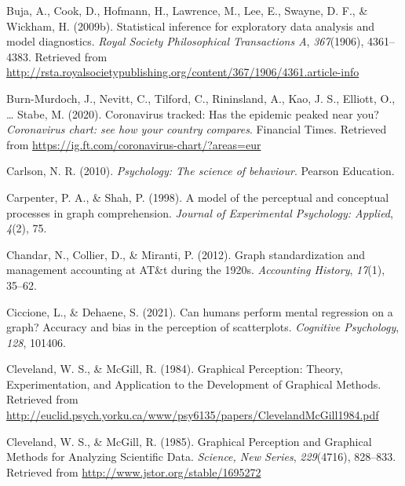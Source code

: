 \documentclass[print]{nuthesis}
\newlength{\cslhangindent}
\newenvironment{CSLReferences}[2]%
{\setlength{\parindent}{0pt}%
\everypar{\setlength{\hangindent}{\cslhangindent}}\ignorespaces}%
{\par}
\begin{document}
\begin{CSLReferences}{1}{0}
\leavevmode{}%
Buja, A., Cook, D., Hofmann, H., Lawrence, M., Lee, E., Swayne, D. F., \& Wickham, H. (2009b). Statistical inference for exploratory data analysis and model diagnostics. \emph{Royal Society Philosophical Transactions A}, \emph{367}(1906), 4361--4383. Retrieved from \url{http://rsta.royalsocietypublishing.org/content/367/1906/4361.article-info}

\leavevmode{}%
Burn-Murdoch, J., Nevitt, C., Tilford, C., Rininsland, A., Kao, J. S., Elliott, O., \ldots{} Stabe, M. (2020). Coronavirus tracked: Has the epidemic peaked near you? \emph{Coronavirus chart: see how your country compares}. Financial Times. Retrieved from \url{https://ig.ft.com/coronavirus-chart/?areas=eur}

\leavevmode{}%
Carlson, N. R. (2010). \emph{Psychology: The science of behaviour}. Pearson Education.

\leavevmode{}%
Carpenter, P. A., \& Shah, P. (1998). A model of the perceptual and conceptual processes in graph comprehension. \emph{Journal of Experimental Psychology: Applied}, \emph{4}(2), 75.

\leavevmode{}%
Chandar, N., Collier, D., \& Miranti, P. (2012). Graph standardization and management accounting at AT\&t during the 1920s. \emph{Accounting History}, \emph{17}(1), 35--62.

\leavevmode{}%
Ciccione, L., \& Dehaene, S. (2021). Can humans perform mental regression on a graph? Accuracy and bias in the perception of scatterplots. \emph{Cognitive Psychology}, \emph{128}, 101406.

\leavevmode{}%
Cleveland, W. S., \& McGill, R. (1984). Graphical {Perception}: {Theory}, {Experimentation}, and {Application} to the {Development} of {Graphical} {Methods}. Retrieved from \url{http://euclid.psych.yorku.ca/www/psy6135/papers/ClevelandMcGill1984.pdf}

\leavevmode{}%
Cleveland, W. S., \& McGill, R. (1985). Graphical {Perception} and {Graphical} {Methods} for {Analyzing} {Scientific} {Data}. \emph{Science, New Series}, \emph{229}(4716), 828--833. Retrieved from \url{http://www.jstor.org/stable/1695272}


\end{CSLReferences}
\end{document}
